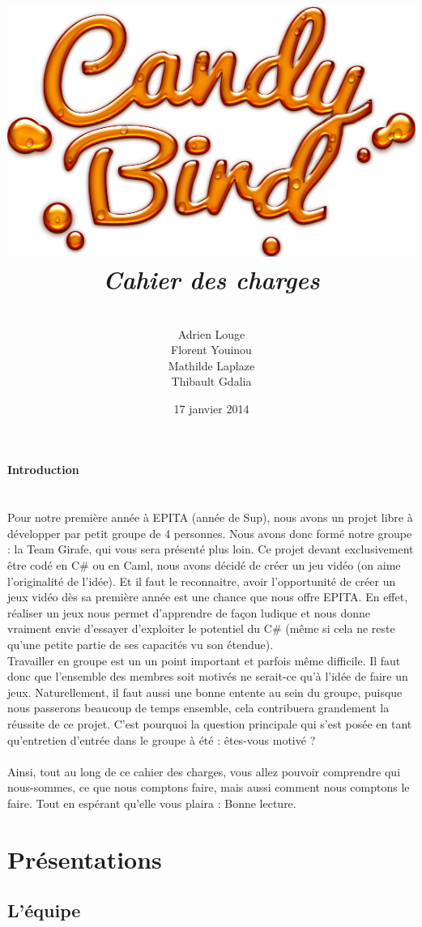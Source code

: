 \documentclass [11pt]{report}
\title{
	\includegraphics[scale=0.43]{images/Logojeu.png}
	 \\\vspace{20mm}
	\textbf{\Huge \itshape Cahier des charges }
	}
\author{ \\\vspace{2mm}
	Adrien Louge \\\vspace{2mm}
	Florent Youinou\\\vspace{2mm}
	Mathilde Laplaze\\\vspace{2mm}
	Thibault Gdalia\\\vspace{30mm}
	}
\date{17 janvier 2014}
\begin{document}
\renewcommand{\baselinestretch}{0.001}
\maketitle
\tableofcontents

\newpage


\textbf{{\Huge Introduction}}\\
\\
\\
		\indent Pour notre première année à EPITA (année de Sup), nous avons un projet libre à développer par petit groupe de 4 personnes. Nous avons donc formé notre groupe : la Team Girafe, qui vous sera présenté plus loin. Ce projet devant exclusivement être codé en C\# ou en Caml, nous avons décidé de créer un jeu vidéo (on 		aime l'originalité de l'idée). Et il faut le reconnaitre, avoir l'opportunité de créer un jeux vidéo dès sa première année est une chance que nous offre EPITA. En effet, réaliser un jeux nous permet d'apprendre de façon ludique et nous donne vraiment envie d'essayer d'exploiter le potentiel du C\# (même si cela ne reste qu'une petite partie 		de ses capacités vu son étendue).\\

		\indent Travailler en groupe est un un point important et parfois même difficile. Il faut donc que l'ensemble des membres soit motivés ne serait-ce qu'à l'idée de faire un jeux. Naturellement, il faut aussi une bonne entente au sein du groupe, puisque nous passerons beaucoup de temps ensemble, cela contribuera grandement la 			réussite de ce projet. C'est pourquoi la question principale qui s'est posée en tant qu'entretien d'entrée dans le groupe à été : êtes-vous motivé ?\\\\
		\indent Ainsi, tout au long de ce cahier des charges, vous allez pouvoir comprendre qui nous-sommes, ce que nous comptons faire, mais aussi comment nous comptons le faire. Tout en espérant qu'elle vous plaira : Bonne lecture.
		
\chapter {Pr\'esentations}

	\section{ L'\'equipe }
\end{document}
